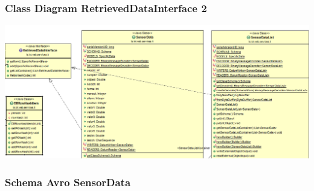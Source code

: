 \documentclass{beamer}
\begin{document}
\begin{frame}
\frametitle{Class Diagram RetrievedDataInterface 2}
\includegraphics[width=1\textwidth]{images/ClassDiagram1.png}
\end{frame}

\begin{frame}
\frametitle{Schema Avro SensorData}
\begin{figure}%
	\centering
	\qquad
\end{figure}
\end{frame}
\end{document}
